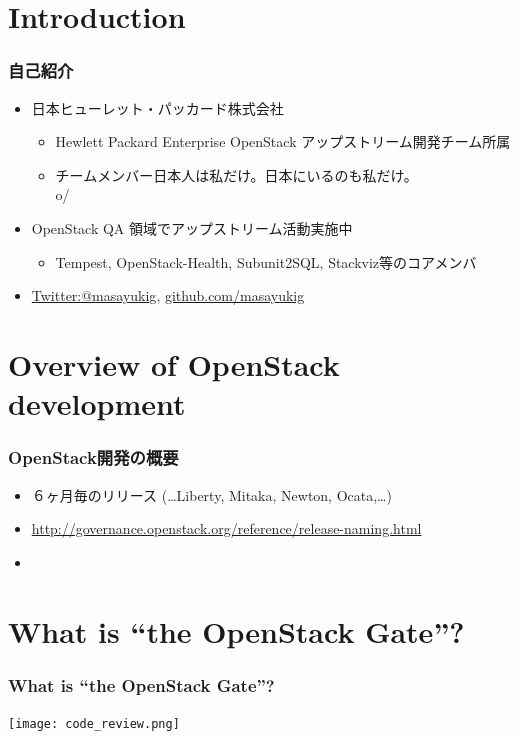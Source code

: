 \documentclass[aspectratio=169,11pt,hyperref={colorlinks=true}]{beamer}
\begin{document}
\section{Introduction}
\begin{frame}
    \frametitle{自己紹介}
    \begin{itemize}
        \item 日本ヒューレット・パッカード株式会社
          \begin{itemize}
            \item Hewlett Packard Enterprise \- OpenStack アップストリーム開発チーム所属
            \item チームメンバー日本人は私だけ。日本にいるのも私だけ。 \\o/
          \end{itemize}
        \item OpenStack QA 領域でアップストリーム活動実施中
          \begin{itemize}
            \item Tempest, OpenStack-Health, Subunit2SQL, Stackviz等のコアメンバ
          \end{itemize}
        \item \href{https://twitter.com/masayukig}{Twitter:@masayukig},
          \href{https://github.com/masayukig}{github.com/masayukig}
    \end{itemize}
\end{frame}

\section{Overview of OpenStack development}
\begin{frame}
    \frametitle{OpenStack開発の概要}
    \begin{itemize}
        \item ６ヶ月毎のリリース (\ldots Liberty, Mitaka, Newton, Ocata,\ldots)
            \item \href{http://governance.openstack.org/reference/release-naming.html}{http://governance.openstack.org/reference/release-naming.html}
        \item
    \end{itemize}
\end{frame}

\section{What is ``the OpenStack Gate''?}
\begin{frame}
    \frametitle{What is ``the OpenStack Gate''?}
	\begin{center}
		\texttt{[image: code\_review.png]}
	\end{center}
\end{frame}
\end{document}
